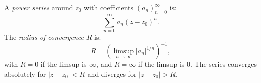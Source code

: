A \textit{power series} around $z_0$ with coefficients $(a_n)_{n=0}^{\infty}$ is:
\[
\sum_{n=0}^{\infty} a_n (z - z_0)^n.
\]
The \textit{radius of convergence} $R$ is:
\[
R = \left(\limsup_{n \to \infty} |a_n|^{1/n}\right)^{-1},
\]
with $R = 0$ if the limsup is $\infty$, and $R = \infty$ if the limsup is $0$. The series converges absolutely for $|z - z_0| < R$ and diverges for $|z - z_0| > R$.
